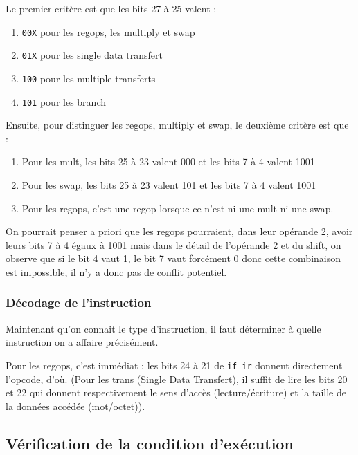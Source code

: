 \documentclass{article}
\begin{document}
Le premier critère est que les bits 27 à 25 valent :
\begin{enumerate}
  \item \texttt{00X}    pour les regops, les multiply et swap
  \item \texttt{01X}    pour les single data transfert
  \item \texttt{100}    pour les multiple transferts
  \item \texttt{101}    pour les branch
\end{enumerate}

Ensuite, pour distinguer les regops, multiply et swap, le deuxième critère est que :
\begin{enumerate}
  \item Pour les mult, les bits 25 à 23 valent 000 et les bits 7 à 4 valent 1001
  \item Pour les swap, les bits 25 à 23 valent 101 et les bits 7 à 4 valent 1001
  \item Pour les regops, c'est une regop lorsque ce n'est ni une mult ni une swap.
\end{enumerate}
On pourrait penser a priori que les regops pourraient, dans leur opérande 2,
avoir leurs bits 7 à 4 égaux à 1001 mais dans le détail de l'opérande 2 et du shift,
on observe que si le bit 4 vaut 1, le bit 7 vaut forcément 0 donc cette combinaison est impossible,
il n'y a donc pas de conflit potentiel.



\subsubsection{Décodage de l'instruction}

Maintenant qu'on connait le type d'instruction, il faut déterminer à quelle instruction
on a affaire précisément.

Pour les regops, c'est immédiat : les bits 24 à 21 de \texttt{if\_ir} donnent directement l'opcode,
d'où. (Pour les trans (Single Data Transfert), il suffit de lire les bits 20 et 22 qui donnent
respectivement le sens d'accès (lecture/écriture) et la taille de la données accédée (mot/octet)).



\subsection{Vérification de la condition d'exécution}
\end{document}

